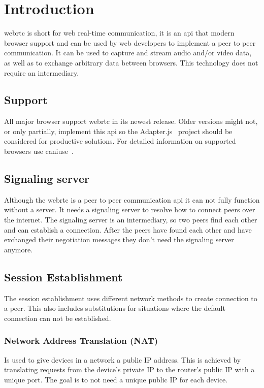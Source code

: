 \clearpage
\chapter{Introduction}
\Gls{webrtc} is short for web real-time communication, it is an \Gls{api} that modern browser support and can be used by web developers to implement a peer to peer communication. It can be used to capture and stream audio and/or video data, as well as to exchange arbitrary data between browsers. This technology does not require an intermediary.

\section{Support}
All major browser support \Gls{webrtc} in its newest release. Older versions might not, or only partially, implement this \Gls{api} so the Adapter.js~\autocite{adapterjs} project should be considered for productive solutions. For detailed information on supported browsers use caniuse~\autocite{caniuse}.

\section{Signaling server}
Although the \Gls{webrtc} is a peer to peer communication \Gls{api} it can not fully function without a server. It needs a signaling server to resolve how to connect peers over the internet. The signaling server is an intermediary, so two peers find each other and can establish a connection. After the peers have found each other and have exchanged their negotiation messages they don't need the signaling server anymore.

\section{Session Establishment}
The session establishment uses different network methods to create connection to a peer. This also includes substitutions for situations where the default connection can not be established.

\subsection{Network Address Translation (NAT)}
Is used to give devices in a network a public IP address. This is achieved by translating requests from the device's private IP to the router's public IP with a unique port. The goal is to not need a unique public IP for each device.

